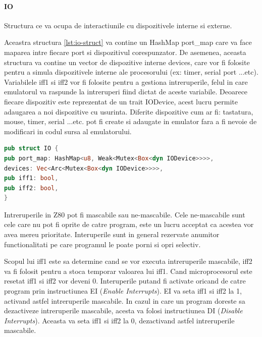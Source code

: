 \documentclass[titlepage,12pt]{article}
\DeclareRobustCommand{\code}[1]{{\ttfamily\small #1}}
\begin{document}
\paragraph{\code{IO}} Structura ce va ocupa de interactiunile cu dispozitivele interne si externe.

Aceastra structura \cref{lst:io-struct} va contine un \code{HashMap port\_map} care va face maparea intre fiecare port si dispozitivul corespunzator. De asemenea, aceasta structura va contine un vector de dispozitive interne devices, care vor fi folosite pentru a simula dispozitivele interne ale procesorului (ex: timer, serial port ...etc).
Variabilele \code{iff1} si \code{iff2} vor fi folosite pentru a gestiona intreruperile, felul in care emulatorul va raspunde la intreruperi fiind dictat de aceste variabile.
Deoarece fiecare dispozitiv este reprezentat de un trait \code{IODevice}, acest lucru permite adaugarea a noi dispozitive cu usurinta. Diferite dispozitive cum ar fi: tastatura, mouse, timer, serial ...etc. pot fi create si adaugate in emulator fara a fi nevoie de modificari in codul sursa al emulatorului.

\begin{lstlisting}[language=Rust,caption={Structura IO},label={lst:io-struct}]
pub struct IO {
pub port_map: HashMap<u8, Weak<Mutex<Box<dyn IODevice>>>>,
devices: Vec<Arc<Mutex<Box<dyn IODevice>>>>,
pub iff1: bool,
pub iff2: bool,
}
\end{lstlisting}

Intreruperile in Z80 pot fi mascabile sau ne-mascabile. Cele ne-mascabile sunt cele care nu pot fi oprite de catre program, este un lucru acceptat ca acestea vor avea mereu prioritate. Interuperile sunt in general rezervate anumitor functionalitati pe care programul le poate porni si opri selectiv.

Scopul lui \code{iff1} este sa determine cand se vor executa intreruperile mascabile, \code{iff2} va fi folosit pentru a stoca temporar valoarea lui \code{iff1}.
Cand microprocesorul este resetat \code{iff1} si \code{iff2} vor deveni 0. Interuperile putand fi activate oricand de catre program prin instructiunea \code{EI} (\emph{Enable Interrupts}). \code{EI} va seta \code{iff1} si \code{iff2} la 1, activand astfel intreruperile mascabile. In cazul in care un program doreste sa dezactiveze intreruperile mascabile, acesta va folosi instructiunea \code{DI} (\emph{Disable Interrupts}). Aceasta va seta \code{iff1} si \code{iff2} la 0, dezactivand astfel intreruperile mascabile.
\end{document}
